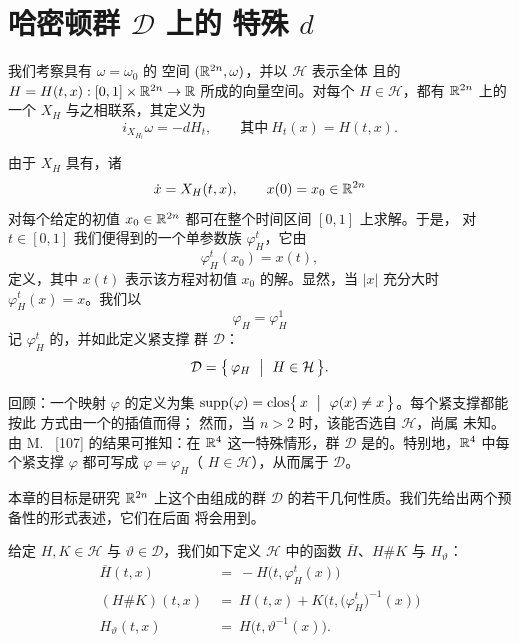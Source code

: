 
\section{哈密顿\trDiffeomorphism{}群 \texorpdfstring{$\mathcal{D}$}{D} 上的%
特殊\trMetric{} \texorpdfstring{$d$}{d}}
\label{sec:special-metric-d}

我们考察具有\trStandard\trSymplecticStructure{} $\omega=\omega_{0}$ 的%
\trSymplectic{}空间 $(\mathbb{R}^{2n},\omega)$，并以 $\mathcal{H}$ 表示全体\trSmooth{}%
且\trCompactSupport{}的\trHamiltonianFunction{} $H=H(t,x):[0,1]\times\R^{2n}%
\to\R$ 所成的向量空间。对每个 $H\in\mathcal{H}$，都有 $\mathbb{R}^{2n}$ 上的一个%
\trTimeDependent\trHamiltonianVectorField{} $X_{H}$ 与之相联系，其定义为
\[
i_{X_{H_{t}}}\omega=-dH_{t},\qquad\text{其中}\ H_{t}(x)=H(t,x).
\]

由于\trVectorField{} $X_{H}$ 具有\trCompactSupport，诸\trHamiltonianEquation
\[
\dot{x}=X_{H}(t,x),\qquad x(0)=x_{0}\in\mathbb{R}^{2n}
\]
对每个给定的初值 $x_{0}\in\mathbb{R}^{2n}$ 都可在整个时间区间 $[0,1]$ 上求解。于是，%
对 $t\in[0,1]$ 我们便得到\trSymplectic\trMapping{}的一个单参数族%
$\varphi_{H}^{t}$，它由
\[
\varphi_{H}^{t}(x_{0})=x(t),
\]
定义，其中 $x(t)$ 表示该方程对初值 $x_{0}$ 的解。显然，当 $\lvert x\rvert$%
充分大时 $\varphi_{H}^{t}(x)=x$。我们以
\[
\varphi_{H}=\varphi_{H}^{1}
\]
记\trFlow{} $\varphi_{H}^{t}$ 的\trTimeOneMap，并如此定义紧支撑%
\trHamiltonianDiffeomorphism{}群 $\mathcal{D}$：
\[
\mathcal{D}=\bigl\{\,\varphi_{H}\ \bigm|\ H\in\mathcal{H}\,\bigr\}.
\]

回顾：一个映射 $\varphi$ 的\trSupport{}定义为\trClosed{}集%
$\operatorname{supp}(\varphi)=\operatorname{clos}\bigl\{\,x\ \bigm|\ %
\varphi(x)\neq x\,\bigr\}$。每个紧支撑\trSymplecticDiffeomorphism{}都能按此%
方式由一个\trTimeDependent\trHamiltonianVectorField{}的\trFlow{}插值而得；%
然而，当 $n>2$ 时，该\trHamiltonianFunction{}能否选自 $\mathcal{H}$，尚属%
未知。由 M.~\trGromov{} [107] 的结果可推知：在 $\mathbb{R}^{4}$ 这一特殊情形，群%
$\mathcal{D}$ 是\trContractible{}的。特别地，$\mathbb{R}^{4}$ 中每个紧支撑%
\trSymplecticDiffeomorphism{} $\varphi$ 都可写成 $\varphi=\varphi_{H}$（%
$H\in\mathcal{H}$），从而属于 $\mathcal{D}$。

本章的目标是研究 $\mathbb{R}^{2n}$ 上这个由\trHamiltonian\trMapping{}组成的群%
$\mathcal{D}$ 的若干几何性质。我们先给出两个预备性的形式表述，它们在后面%
将会用到。

\begin{definition}\label{def:function-operations}
给定 $H,K\in\mathcal{H}$ 与 $\vartheta\in\mathcal{D}$，我们如下定义%
$\mathcal{H}$ 中的函数 $\overline{H}$、$H\#K$ 与 $H_{\vartheta}$：
\begin{align*}
\overline{H}(t,x)\ &=\ -H\bigl(t,\varphi_{H}^{t}(x)\bigr)\\
(H\#K)(t,x)\ &=\ H(t,x)+K\bigl(t,\bigl(\varphi_{H}^{t}\bigr)^{-1}(x)\bigr)\\
H_{\vartheta}(t,x)\ &=\ H\bigl(t,\vartheta^{-1}(x)\bigr).
\end{align*}
\end{definition}

